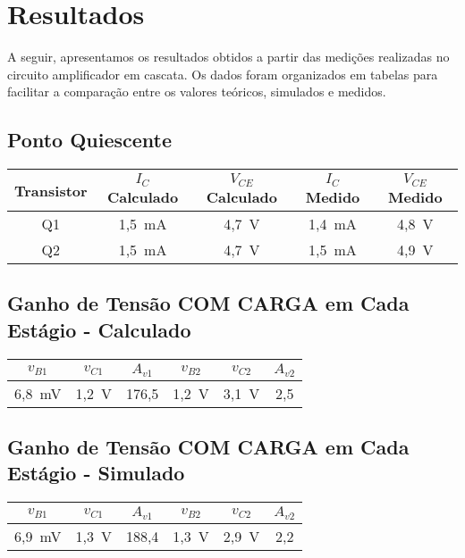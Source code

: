 \section{Resultados}

A seguir, apresentamos os resultados obtidos a partir das medições realizadas no circuito amplificador em cascata. Os dados foram organizados em tabelas para facilitar a comparação entre os valores teóricos, simulados e medidos.

\subsection{Ponto Quiescente}
\begin{center}
    \begin{tabular}{|c|c|c|c|c|}
        \hline
        \textbf{Transistor} & \textbf{$I_C$ Calculado} & \textbf{$V_{CE}$ Calculado} & \textbf{$I_C$ Medido} & \textbf{$V_{CE}$ Medido} \\
        \hline
        Q1 & 1,5~mA & 4,7~V & 1,4~mA & 4,8~V \\
        Q2 & 1,5~mA & 4,7~V & 1,5~mA & 4,9~V \\
        \hline
    \end{tabular}
\end{center}

\subsection{Ganho de Tensão COM CARGA em Cada Estágio - Calculado}
\begin{center}
    \begin{tabular}{|c|c|c|c|c|c|}
        \hline
        $v_{B1}$ & $v_{C1}$ & $A_{v1}$ & $v_{B2}$ & $v_{C2}$ & $A_{v2}$ \\
        \hline
        6,8~mV & 1,2~V & 176,5 & 1,2~V & 3,1~V & 2,5 \\
        \hline
    \end{tabular}
\end{center}

\subsection{Ganho de Tensão COM CARGA em Cada Estágio - Simulado}
\begin{center}
    \begin{tabular}{|c|c|c|c|c|c|}
        \hline
        $v_{B1}$ & $v_{C1}$ & $A_{v1}$ & $v_{B2}$ & $v_{C2}$ & $A_{v2}$ \\
        \hline
        6,9~mV & 1,3~V & 188,4 & 1,3~V & 2,9~V & 2,2 \\
        \hline
    \end{tabular}
\end{center}

